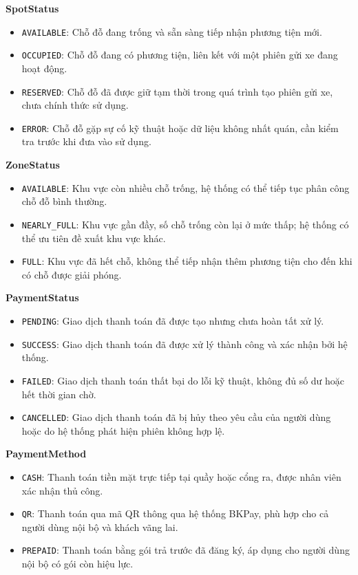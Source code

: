 \noindent\textbf{SpotStatus}
\begin{itemize}
	\item \texttt{AVAILABLE}: Chỗ đỗ đang trống và sẵn sàng tiếp nhận phương tiện mới.
	\item \texttt{OCCUPIED}: Chỗ đỗ đang có phương tiện, liên kết với một phiên gửi xe đang hoạt động.
	\item \texttt{RESERVED}: Chỗ đỗ đã được giữ tạm thời trong quá trình tạo phiên gửi xe, chưa chính thức sử dụng.
	\item \texttt{ERROR}: Chỗ đỗ gặp sự cố kỹ thuật hoặc dữ liệu không nhất quán, cần kiểm tra trước khi đưa vào sử dụng.
\end{itemize}

\noindent\textbf{ZoneStatus}
\begin{itemize}
	\item \texttt{AVAILABLE}: Khu vực còn nhiều chỗ trống, hệ thống có thể tiếp tục phân công chỗ đỗ bình thường.
	\item \texttt{NEARLY\_FULL}: Khu vực gần đầy, số chỗ trống còn lại ở mức thấp; hệ thống có thể ưu tiên đề xuất khu vực khác.
	\item \texttt{FULL}: Khu vực đã hết chỗ, không thể tiếp nhận thêm phương tiện cho đến khi có chỗ được giải phóng.
\end{itemize}

\noindent\textbf{PaymentStatus}
\begin{itemize}
	\item \texttt{PENDING}: Giao dịch thanh toán đã được tạo nhưng chưa hoàn tất xử lý.
	\item \texttt{SUCCESS}: Giao dịch thanh toán đã được xử lý thành công và xác nhận bởi hệ thống.
	\item \texttt{FAILED}: Giao dịch thanh toán thất bại do lỗi kỹ thuật, không đủ số dư hoặc hết thời gian chờ.
	\item \texttt{CANCELLED}: Giao dịch thanh toán đã bị hủy theo yêu cầu của người dùng hoặc do hệ thống phát hiện phiên không hợp lệ.
\end{itemize}

\noindent\textbf{PaymentMethod}
\begin{itemize}
	\item \texttt{CASH}: Thanh toán tiền mặt trực tiếp tại quầy hoặc cổng ra, được nhân viên xác nhận thủ công.
	\item \texttt{QR}: Thanh toán qua mã QR thông qua hệ thống \mbox{BKPay}, phù hợp cho cả người dùng nội bộ và khách vãng lai.
	\item \texttt{PREPAID}: Thanh toán bằng gói trả trước đã đăng ký, áp dụng cho người dùng nội bộ có gói còn hiệu lực.
\end{itemize}

